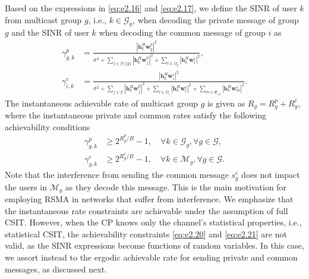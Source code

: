 \documentclass[12pt,draftcls,onecolumn]{IEEEtran}
\newcommand{\CommaPunct}{\mathpunct{\raisebox{0.5ex}{,}}}
\theoremstyle{remark}
\theoremstyle{definition}
\begin{document}
{	Based on the expressions in \eqref{eq:e2.16} and \eqref{eq:e2.17}, we define the SINR of user $k$ from multicast group $g$, i.e., $k\in\mathcal{G}_g$, when decoding the private message of group $g$ and the SINR of user $k$ when decoding the common message of group $i$ as\\
	\begin{align}
	\label{eq:e2.18}
	\gamma_{g,k}^p &= \frac{\left|\mathbf{h}_{k}^{H}\mathbf{w}_{g}^p \right|^2}{\sigma^2 + \sum\limits_{j \in \mathcal{G}\setminus \{g\}}\left|\mathbf{h}_{k}^{H}\mathbf{w}_{j}^p \right|^2 + \sum\limits_{l \in \Omega_g}\left|\mathbf{h}_{k}^{H}\mathbf{w}_{l}^c \right|^2},\\
	\label{eq:e2.19}
	\gamma_{i, k}^c &= \frac{\left|\mathbf{h}_{k}^{H}\mathbf{w}_{i}^c \right|^2}{\sigma^2+\sum\limits_{j \in \mathcal{G}}\left|\mathbf{h}_{k}^{H}\mathbf{w}_{j}^p \right|^2 + \sum\limits_{l \in \Omega_{i}}\left|\mathbf{h}_{k}^{H}\mathbf{w}_{l}^c \right|^2 + \sum\limits_{m  \in \Psi_{i, k}}\left|\mathbf{h}_{k}^{H}\mathbf{w}_{m}^c \right|^2} .%
	\end{align}   
	The instantaneous achievable rate of multicast group $g$ is given as $R_g = R_{g}^p + R_{g}^c$, where the instantaneous private and common rates satisfy the following achievability conditions
	\begin{align}
	\gamma_{g,k}^p &\geq 2^{R_{g}^p/B} - 1, \quad \forall k \in \mathcal{G}_g, \forall g \in \mathcal{G}, \label{eq:e2.20}\\
	\gamma_{g,k}^c &\geq 2^{R_{g}^c/B} - 1, \quad \forall k \in \mathcal{M}_g, \forall g \in \mathcal{G}. \label{eq:e2.21}
	\end{align}
	Note that the interference from sending the common message $s_g^c$ does not impact the users in $\mathcal{M}_g$ as they decode this message. This is the main motivation for employing RSMA in networks that suffer from interference. We emphasize that the instantaneous rate constraints are achievable under the assumption of full CSIT. However, when the CP knows only the channel's statistical properties, i.e., statistical CSIT, the achievability constraints \eqref{eq:e2.20} and \eqref{eq:e2.21} are not valid, as the SINR expressions become functions of random variables. In this case, we assort instead to the ergodic achievable rate for sending private and common messages, as discussed next. 
}
\end{document}
